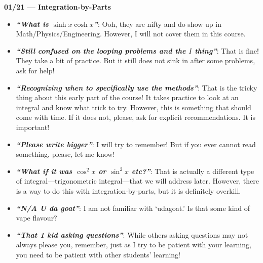 \documentclass[11pt,letterpaper]{article}
\newcommand{\comment}[1]{{\itshape\bfseries ``#1''}:}
\begin{document}
{\bfseries\large 01/21 --- Integration-by-Parts}

\begin{itemize}
\item \comment{What is $\sinh x \cosh x$} Ooh, they are nifty and do show up in Math/Physics/Engineering. However, I will not cover them in this course. 
\item \comment{Still confused on the looping problems and the $I$ thing} That is fine! They take a bit of practice. But it still does not sink in after some problems, ask for help!
\item \comment{Recognizing when to specifically use the methods} That is the tricky thing about this early part of the course! It takes practice to look at an integral and know what trick to try. However, this is something that should come with time. If it does not, please, ask for explicit recommendations. It is important!
\item \comment{Please write bigger} I will try to remember! But if you ever cannot read something, please, let me know!
\item \comment{What if it was $\cos^2 x$ or $\sin^2 x$ etc?} That is actually a different type of integral---trigonometric integral---that we will address later. However, there is a way to do this with integration-by-parts, but it is definitely overkill. 
\item \comment{N/A U da goat} I am not familiar with `udagoat.' Is that some kind of vape flavour? 
\item \comment{That 1 kid asking questions} While others asking questions may not always please you, remember, just as I try to be patient with your learning, you need to be patient with other students' learning!
\end{itemize}
\end{document}
